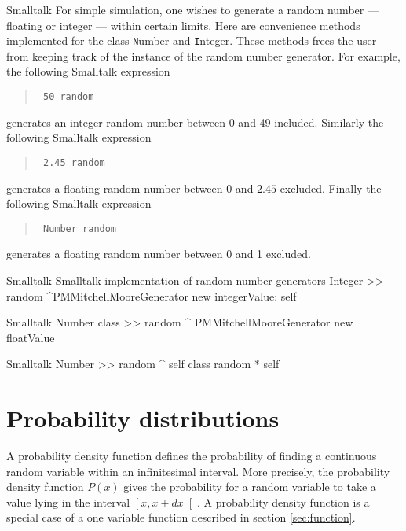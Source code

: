 \begin{displaycode}{Smalltalk}
For simple simulation, one wishes to generate a random number ---
floating or integer --- within certain limits. Here are
convenience methods implemented for the class {\texttt Number} and
{\texttt Integer}. These methods frees the user from keeping track of
the instance of the random number generator. For example, the
following Smalltalk expression
\begin{quote}
\begin{verbatim}
 50 random
\end{verbatim}
\end{quote}
\noindent generates an integer random number between 0 and 49
included. Similarly the following Smalltalk expression
\begin{quote}
\begin{verbatim}
 2.45 random
\end{verbatim}
\end{quote}
\noindent generates a floating random number between 0 and $2.45$
excluded. Finally the following Smalltalk expression
\begin{quote}
\begin{verbatim}
 Number random
\end{verbatim}
\end{quote}
\noindent generates a floating random number between 0 and 1
excluded.

\label{ls:randomuse}
\begin{listing}[label=lst:matrix]{Smalltalk}
  {Smalltalk implementation of random number generators}
Integer >> random
    ^PMMitchellMooreGenerator new integerValue: self
\end{listing}

\begin{displaycode}{Smalltalk}
Number class >> random
    ^ PMMitchellMooreGenerator new floatValue
\end{displaycode}

\begin{displaycode}{Smalltalk}
Number >> random
    ^ self class random * self
\end{displaycode}

\section{Probability distributions}
\label{sec:probdistr}A probability density function defines the probability of finding a continuous random variable within an infinitesimal interval.
More precisely, the probability density function $P\left(x\right)$ gives the probability for a random variable to take a value lying in the interval $\left[x,x+dx\right[$.
A probability density function is a special case of a one variable function described in section
\ref{sec:function}.


\end{displaycode}
